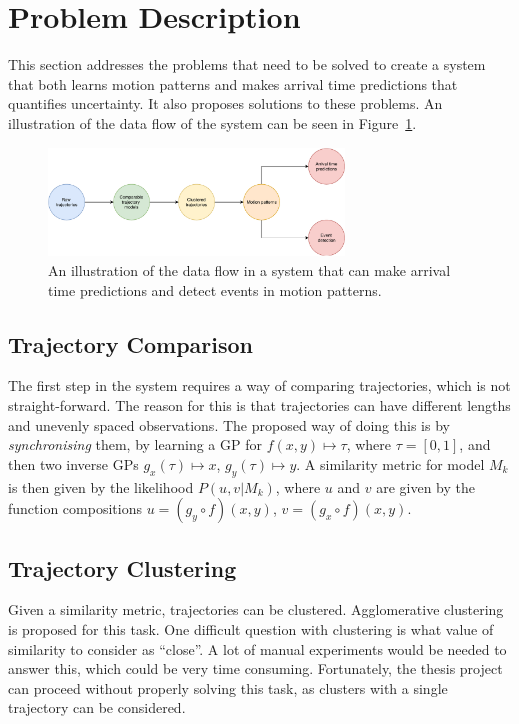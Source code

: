 \section{Problem Description}
This section addresses the problems that need to be solved to create a
system that both learns motion patterns and makes arrival
time predictions that quantifies uncertainty. It also proposes
solutions to these problems. An illustration of the data flow of the
system can be seen in Figure~\ref{fig:system-subproblems}.
\begin{figure}[H]
  \centering
  \includegraphics[width=0.7\textwidth]{figures/system-subproblems}
  \caption{An illustration of the data flow in a system that can make
    arrival time predictions and detect events in motion patterns.}\label{fig:system-subproblems}
\end{figure}

\subsection{Trajectory Comparison}
The first step in the system requires a way of comparing
trajectories, which is not straight-forward. The reason for this is that trajectories
can have different lengths and unevenly spaced observations.
The proposed way of doing this is by \textit{synchronising} them,
by learning a GP for \(f(x, y) \mapsto \tau\), where \(\tau = [0, 1]\), and then 
two inverse GPs \(g_x(\tau) \mapsto x\), \(g_y(\tau) \mapsto y\). A similarity
metric for model \(M_k\) is then given by the likelihood \(P(u, v | M_k)\), where
$u$ and $v$ are given by the function compositions \(u = (g_{y} \circ f)(x, y)\),
\(v = (g_{x} \circ f)(x, y)\).


\subsection{Trajectory Clustering}
Given a similarity metric, trajectories can be
clustered. Agglomerative clustering is proposed for this task.
One difficult question with clustering is what value of similarity to consider
as ``close''. A lot of manual experiments would be needed to
answer this, which could be very time consuming. Fortunately, the thesis
project can proceed without properly solving this task, as clusters
with a single trajectory can be considered.

